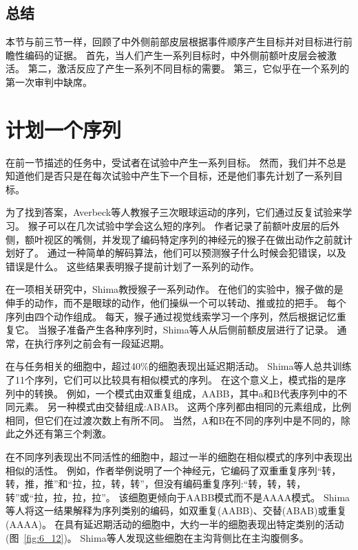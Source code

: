 \subsection{总结}

本节与前三节一样，回顾了中外侧前部皮层根据事件顺序产生目标并对目标进行前瞻性编码的证据。
首先，当人们产生一系列目标时，中外侧前额叶皮层会被激活。
第二，激活反应了产生一系列不同目标的需要。
第三，它似乎在一个系列的第一次审判中缺席。



\section{计划一个序列}

在前一节描述的任务中，受试者在试验中产生一系列目标。
然而，我们并不总是知道他们是否只是在每次试验中产生下一个目标，还是他们事先计划了一系列目标。


为了找到答案，Averbeck等人\cite{averbeck2006activity}教猴子三次眼球运动的序列，它们通过反复试验来学习。
猴子可以在几次试验中学会这么短的序列。
作者记录了前额叶皮层的后外侧，额叶视区的嘴侧，并发现了编码特定序列的神经元的猴子在做出动作之前就计划好了。
通过一种简单的解码算法，他们可以预测猴子什么时候会犯错误，以及错误是什么。
这些结果表明猴子提前计划了一系列的动作。


在一项相关研究中，Shima\cite{shima2007categorization}教授猴子一系列动作。
在他们的实验中，猴子做的是伸手的动作，而不是眼球的动作，他们操纵一个可以转动、推或拉的把手。
每个序列由四个动作组成。
每天，猴子通过视觉线索学习一个序列，然后根据记忆重复它。
当猴子准备产生各种序列时，Shima等人从后侧前额皮层进行了记录。
通常，在执行序列之前会有一段延迟期。


在与任务相关的细胞中，超过40\%的细胞表现出延迟期活动。
Shima等人\cite{shima2007categorization}总共训练了11个序列，它们可以比较具有相似模式的序列。
在这个意义上，模式指的是序列中的转换。
例如，一个模式由双重复组成，AABB，其中a和B代表序列中的不同元素。
另一种模式由交替组成:ABAB。
这两个序列都由相同的元素组成，比例相同，但它们在过渡次数上有所不同。
当然，A和B在不同的序列中是不同的，除此之外还有第三个刺激。


在不同序列表现出不同活性的细胞中，超过一半的细胞在相似模式的序列中表现出相似的活性。
例如，作者举例说明了一个神经元，它编码了双重重复序列“转，转，推，推”和“拉，拉，转，转”，但没有编码重复序列:“转，转，转，转”或“拉，拉，拉，拉”。
该细胞更倾向于AABB模式而不是AAAA模式。
Shima等人将这一结果解释为序列类别的编码，如双重复(AABB)、交替(ABAB)或重复(AAAA)。
在具有延迟期活动的细胞中，大约一半的细胞表现出特定类别的活动(图~\ref{fig:6_12})。
Shima等人发现这些细胞在主沟背侧比在主沟腹侧多。



